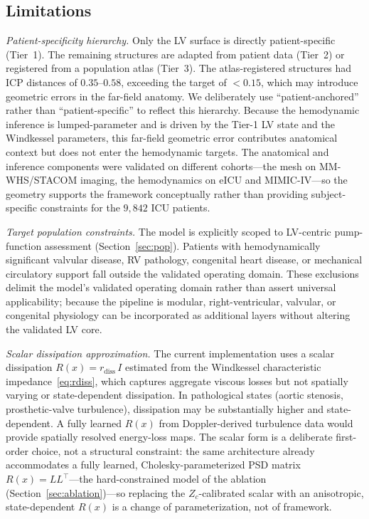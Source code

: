 \documentclass[journal]{IEEEtran}
\begin{document}
\subsection{Limitations}
\emph{Patient-specificity hierarchy.} Only the LV surface is directly patient-specific (Tier~1). The remaining structures are adapted from patient data (Tier~2) or registered from a population atlas (Tier~3). The atlas-registered structures had ICP distances of $0.35$--$0.58$, exceeding the target of $<0.15$, which may introduce geometric errors in the far-field anatomy. We deliberately use ``patient-anchored'' rather than ``patient-specific'' to reflect this hierarchy. Because the hemodynamic inference is lumped-parameter and is driven by the Tier-1 LV state and the Windkessel parameters, this far-field geometric error contributes anatomical context but does not enter the hemodynamic targets. The anatomical and inference components were validated on different cohorts---the mesh on MM-WHS/STACOM imaging, the hemodynamics on eICU and MIMIC-IV---so the geometry supports the framework conceptually rather than providing subject-specific constraints for the $9{,}842$ ICU patients.

\emph{Target population constraints.} The model is explicitly scoped to LV-centric pump-function assessment (Section~\ref{sec:pop}). Patients with hemodynamically significant valvular disease, RV pathology, congenital heart disease, or mechanical circulatory support fall outside the validated operating domain. These exclusions delimit the model's validated operating domain rather than assert universal applicability; because the pipeline is modular, right-ventricular, valvular, or congenital physiology can be incorporated as additional layers without altering the validated LV core.

\emph{Scalar dissipation approximation.} The current implementation uses a scalar dissipation $R(x)=r_{\text{diss}}\,I$ estimated from the Windkessel characteristic impedance~\eqref{eq:rdiss}, which captures aggregate viscous losses but not spatially varying or state-dependent dissipation. In pathological states (aortic stenosis, prosthetic-valve turbulence), dissipation may be substantially higher and state-dependent. A fully learned $R(x)$ from Doppler-derived turbulence data would provide spatially resolved energy-loss maps. The scalar form is a deliberate first-order choice, not a structural constraint: the same architecture already accommodates a fully learned, Cholesky-parameterized PSD matrix $R(x)=LL^{\top}$---the hard-constrained model of the ablation (Section~\ref{sec:ablation})---so replacing the $Z_c$-calibrated scalar with an anisotropic, state-dependent $R(x)$ is a change of parameterization, not of framework.
\end{document}
